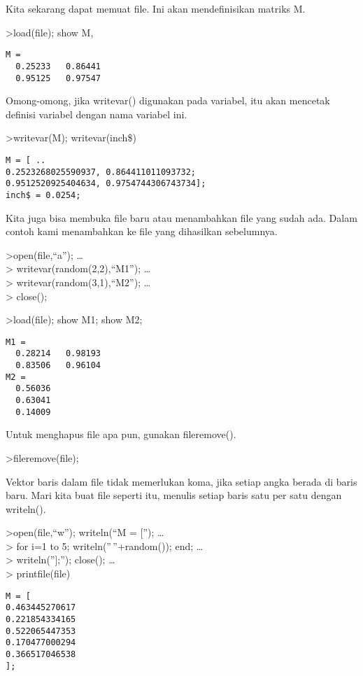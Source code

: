 \documentclass[
]{book}
\begin{document}
Kita sekarang dapat memuat file. Ini akan mendefinisikan matriks M.

\textgreater load(file); show M,

\begin{verbatim}
M = 
  0.25233   0.86441 
  0.95125   0.97547 
\end{verbatim}

Omong-omong, jika writevar() digunakan pada variabel, itu akan mencetak definisi variabel dengan nama variabel ini.

\textgreater writevar(M); writevar(inch\$)

\begin{verbatim}
M = [ ..
0.2523268025590937, 0.864411011093732;
0.9512520925404634, 0.9754744306743734];
inch$ = 0.0254;
\end{verbatim}

Kita juga bisa membuka file baru atau menambahkan file yang sudah ada. Dalam contoh kami menambahkan ke file yang dihasilkan sebelumnya.

\textgreater open(file,``a''); \ldots{}\\
\textgreater{} writevar(random(2,2),``M1''); \ldots{}\\
\textgreater{} writevar(random(3,1),``M2''); \ldots{}\\
\textgreater{} close();

\textgreater load(file); show M1; show M2;

\begin{verbatim}
M1 = 
  0.28214   0.98193 
  0.83506   0.96104 
M2 = 
  0.56036 
  0.63041 
  0.14009 
\end{verbatim}

Untuk menghapus file apa pun, gunakan fileremove().

\textgreater fileremove(file);

Vektor baris dalam file tidak memerlukan koma, jika setiap angka berada di baris baru. Mari kita buat file seperti itu, menulis setiap baris satu per satu dengan writeln().

\textgreater open(file,``w''); writeln(``M = {[}''); \ldots{}\\
\textgreater{} for i=1 to 5; writeln(''\,''+random()); end; \ldots{}\\
\textgreater{} writeln(''{]};''); close(); \ldots{}\\
\textgreater{} printfile(file)

\begin{verbatim}
M = [
0.463445270617
0.221854334165
0.522065447353
0.170477000294
0.366517046538
];
\end{verbatim}
\end{document}
